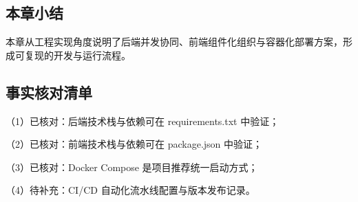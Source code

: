 \subsection{本章小结}
本章从工程实现角度说明了后端并发协同、前端组件化组织与容器化部署方案，形成可复现的开发与运行流程。

\subsection{事实核对清单}
（1）已核对：后端技术栈与依赖可在 requirements.txt 中验证；

（2）已核对：前端技术栈与依赖可在 package.json 中验证；

（3）已核对：Docker Compose 是项目推荐统一启动方式；

（4）待补充：CI/CD 自动化流水线配置与版本发布记录。
